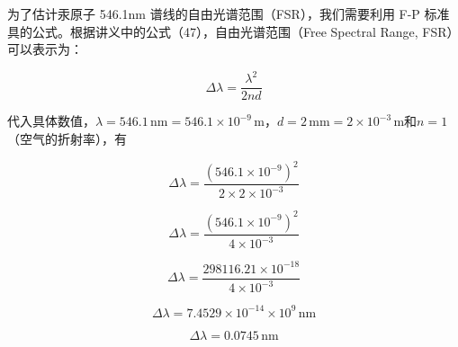 \documentclass[dvipsnames, svgnames,a4paper,11pt]{article}
\begin{document}
	为了估计汞原子 546.1nm 谱线的自由光谱范围（FSR），我们需要利用 F-P 标准具的公式。根据讲义中的公式（47），自由光谱范围（Free Spectral Range, FSR）可以表示为：
	
	\[
	\Delta \lambda = \frac{\lambda^2}{2nd}
	\]
	
	代入具体数值，\(\lambda = 546.1 \, \text{nm} = 546.1 \times 10^{-9} \, \text{m}\)，\(d = 2 \, \text{mm} = 2 \times 10^{-3} \, \text{m}\)和\(n = 1\)（空气的折射率），有
	
	\[
	\Delta \lambda = \frac{(546.1 \times 10^{-9})^2}{2 \times 2 \times 10^{-3}}
	\]
	
	\[
	\Delta \lambda = \frac{(546.1 \times 10^{-9})^2}{4 \times 10^{-3}}
	\]
	
	\[
	\Delta \lambda = \frac{298116.21 \times 10^{-18}}{4 \times 10^{-3}}
	\]
	
	\[
	\Delta \lambda = 7.4529 \times 10^{-14} \times 10^9 \, \text{nm}
	\]
	
	\[
	\Delta \lambda = 0.0745 \, \text{nm}
	\]
	
\end{document}

